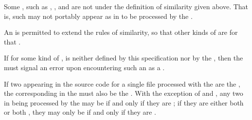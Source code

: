 \endlist

\endsubsubsection%


Some , such as , , and 
are not  under the definition of similarity given above.
That is, such  may not portably appear as   
in  to be processed by the . 

An  is permitted to extend the rules of similarity, 
so that other kinds of  are 
for that .

If for some kind of ,  is
neither defined by this specification 
	    nor by the , 
then the  must signal an error upon encountering such 
an  as a .

\endsubsubsection%
  


If two  appearing in the source code for a single file
processed with
the  
are the ,
the corresponding  in the  
must also be the .
With the exception of  and , any two
in  being processed by
the 
may be  
if and only if they are ; 
if they are either both  or both ,
they may only be  if and only if they are .

